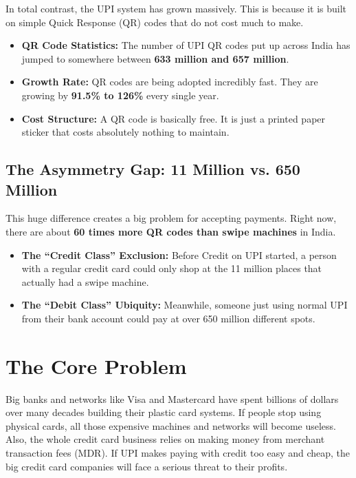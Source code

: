 In total contrast, the UPI system has grown massively. This is because it is built on simple Quick Response (QR) codes that do not cost much to make.

\begin{itemize}
    \item \textbf{QR Code Statistics:} The number of UPI QR codes put up across India has jumped to somewhere between \textbf{633 million and 657 million}.
    \item \textbf{Growth Rate:} QR codes are being adopted incredibly fast. They are growing by \textbf{91.5\% to 126\%} every single year.
    \item \textbf{Cost Structure:} A QR code is basically free. It is just a printed paper sticker that costs absolutely nothing to maintain.
\end{itemize}

\subsection{The Asymmetry Gap: 11 Million vs. 650 Million}

This huge difference creates a big problem for accepting payments. Right now, there are about \textbf{60 times more QR codes than swipe machines} in India.

\begin{itemize}
    \item \textbf{The ``Credit Class'' Exclusion:} Before Credit on UPI started, a person with a regular credit card could only shop at the 11 million places that actually had a swipe machine.
    \item \textbf{The ``Debit Class'' Ubiquity:} Meanwhile, someone just using normal UPI from their bank account could pay at over 650 million different spots.
\end{itemize}

\section{The Core Problem}

Big banks and networks like Visa and Mastercard have spent billions of dollars over many decades building their plastic card systems. If people stop using physical cards, all those expensive machines and networks will become useless. Also, the whole credit card business relies on making money from merchant transaction fees (MDR). If UPI makes paying with credit too easy and cheap, the big credit card companies will face a serious threat to their profits.

\vspace{0.5cm}

\noindent{}